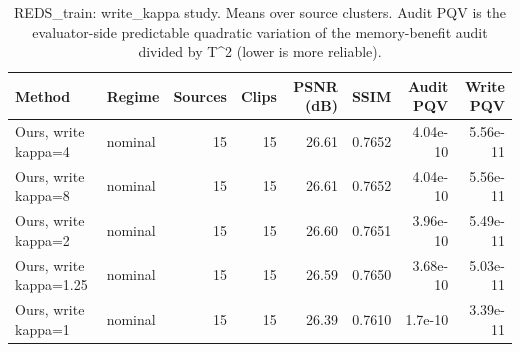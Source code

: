 \begin{table}[t]
\centering
\caption{REDS\_train: write\_kappa study. Means over source clusters. Audit PQV is the evaluator-side predictable quadratic variation of the memory-benefit audit divided by T^2 (lower is more reliable).}
\label{tab:write_kappa_REDS_train}
\small
\begin{tabular}{llrrrrrr}
\toprule
Method & Regime & Sources & Clips & PSNR (dB) & SSIM & Audit PQV & Write PQV \\
\midrule
Ours, write kappa=4 & nominal & 15 & 15 & 26.61 & 0.7652 & 4.04e-10 & 5.56e-11 \\
Ours, write kappa=8 & nominal & 15 & 15 & 26.61 & 0.7652 & 4.04e-10 & 5.56e-11 \\
Ours, write kappa=2 & nominal & 15 & 15 & 26.60 & 0.7651 & 3.96e-10 & 5.49e-11 \\
Ours, write kappa=1.25 & nominal & 15 & 15 & 26.59 & 0.7650 & 3.68e-10 & 5.03e-11 \\
Ours, write kappa=1 & nominal & 15 & 15 & 26.39 & 0.7610 & 1.7e-10 & 3.39e-11 \\
\bottomrule
\end{tabular}
\end{table}

